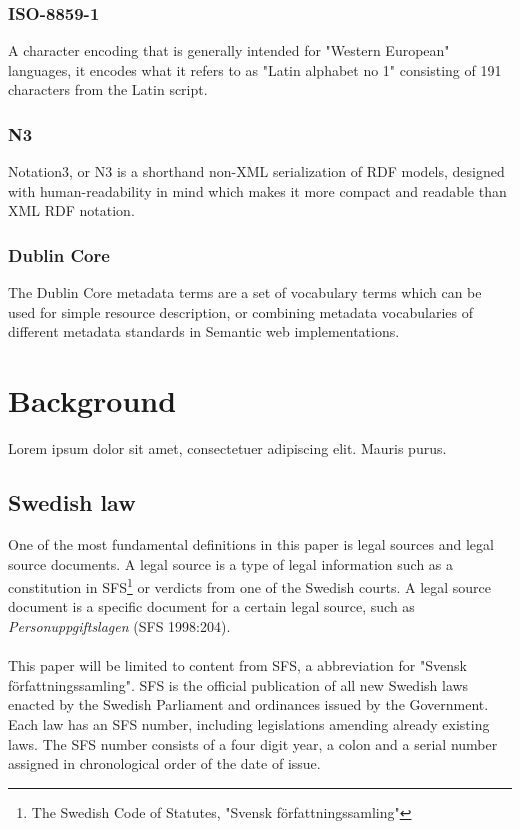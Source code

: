 \documentclass[a4paper,11pt]{kth-mag}
\begin{document}
\subsection*{ISO-8859-1} A character encoding that is generally intended for
"Western European" languages, it encodes what it refers to as "Latin alphabet
no 1" consisting of 191 characters from the Latin script.

\subsection*{N3}
Notation3, or N3 is a shorthand non-XML serialization of RDF models,
designed with human-readability in mind which makes it more compact and
readable than XML RDF notation.

\subsection*{Dublin Core}
The Dublin Core metadata terms are a set of vocabulary terms which
can be used for simple resource description, or combining metadata
vocabularies of different metadata standards in Semantic web implementations.

\chapter{Background}

Lorem ipsum dolor sit amet, consectetuer adipiscing elit. Mauris
purus. 

\section{Swedish law}
One of the most fundamental definitions in this paper is legal sources and legal source documents. A legal source is a type of legal information such as a constitution in SFS\footnote{The Swedish Code of Statutes, "Svensk författningssamling"} or verdicts from one of the Swedish courts. A legal source document is a specific document for a certain legal source, such as \textit{Personuppgiftslagen} (SFS 1998:204).\\\\ 
This paper will be limited to content from SFS, a abbreviation for "Svensk författningssamling". SFS is the official publication of all new Swedish laws enacted by the Swedish Parliament and ordinances issued by the Government. Each law has an SFS number, including legislations amending already existing laws. The SFS number consists of a four digit year, a colon and a serial number assigned in chronological order of the date of issue. 
\end{document}
